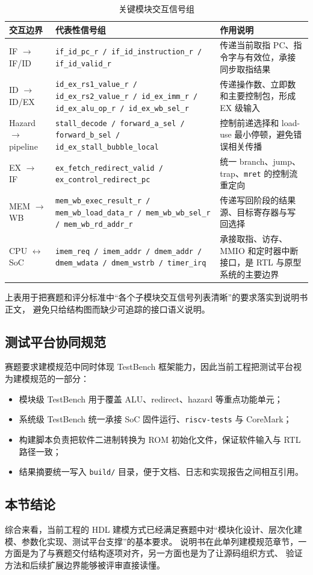 \begin{table}[H]
    \centering
    \small
    \caption{关键模块交互信号组}
    \begin{tabularx}{0.95\textwidth}{L{0.20\textwidth} L{0.36\textwidth} Y}
        \toprule
        交互边界 & 代表性信号组 & 作用说明 \\
        \midrule
        IF $\rightarrow$ IF/ID & \texttt{if\_id\_pc\_r / if\_id\_instruction\_r / if\_id\_valid\_r} & 传递当前取指 PC、指令字与有效位，承接同步取指结果 \\
        ID $\rightarrow$ ID/EX & \texttt{id\_ex\_rs1\_value\_r / id\_ex\_rs2\_value\_r / id\_ex\_imm\_r / id\_ex\_alu\_op\_r / id\_ex\_wb\_sel\_r} & 传递操作数、立即数和主要控制包，形成 EX 级输入 \\
        Hazard $\rightarrow$ pipeline & \texttt{stall\_decode / forward\_a\_sel / forward\_b\_sel / id\_ex\_stall\_bubble\_local} & 控制前递选择和 load-use 最小停顿，避免错误相关传播 \\
        EX $\rightarrow$ IF & \texttt{ex\_fetch\_redirect\_valid / ex\_control\_redirect\_pc} & 统一 branch、jump、trap、\texttt{mret} 的控制流重定向 \\
        MEM $\rightarrow$ WB & \texttt{mem\_wb\_exec\_result\_r / mem\_wb\_load\_data\_r / mem\_wb\_wb\_sel\_r / mem\_wb\_rd\_addr\_r} & 传递写回阶段的结果源、目标寄存器与写回选择 \\
        CPU $\leftrightarrow$ SoC & \texttt{imem\_req / imem\_addr / dmem\_addr / dmem\_wdata / dmem\_wstrb / timer\_irq} & 承接取指、访存、MMIO 和定时器中断接口，是 RTL 与原型系统的主要边界 \\
        \bottomrule
    \end{tabularx}
\end{table}

上表用于把赛题和评分标准中“各个子模块交互信号列表清晰”的要求落实到说明书正文，
避免只给结构图而缺少可追踪的接口语义说明。

\subsection{测试平台协同规范}

赛题要求建模规范中同时体现 TestBench 框架能力，因此当前工程把测试平台视为建模规范的一部分：
\begin{itemize}
    \item 模块级 TestBench 用于覆盖 ALU、redirect、hazard 等重点功能单元；
    \item 系统级 TestBench 统一承接 SoC 固件运行、\texttt{riscv-tests} 与 CoreMark；
    \item 构建脚本负责把软件二进制转换为 ROM 初始化文件，保证软件输入与 RTL 路径一致；
    \item 结果摘要统一写入 \texttt{build/} 目录，便于文档、日志和实现报告之间相互引用。
\end{itemize}

\subsection{本节结论}

综合来看，当前工程的 HDL 建模方式已经满足赛题中对“模块化设计、层次化建模、参数化实现、测试平台支撑”的基本要求。
说明书在此单列建模规范章节，一方面是为了与赛题交付结构逐项对齐，另一方面也是为了让源码组织方式、
验证方法和后续扩展边界能够被评审直接读懂。
